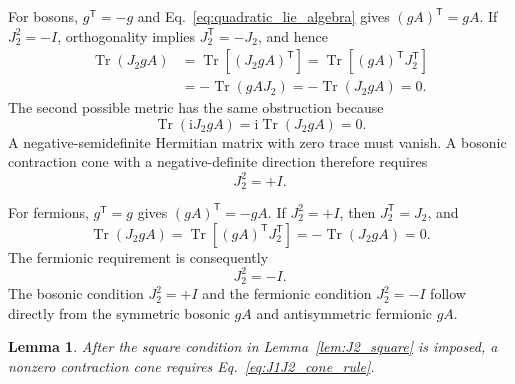 \documentclass[onecolumn,aps,prb,amsmath,amssymb,superscriptaddress,longbibliography,floatfix]{revtex4-2}
\newcommand{\Tr}{\operatorname{Tr}}
\newcommand{\ii}{\mathrm{i}}
\newcommand{\trans}{\mathsf{T}}
\newtheorem{lemma}{Lemma}
\begin{document}
For bosons, \(g^\trans=-g\) and Eq.~\eqref{eq:quadratic_lie_algebra} gives \((gA)^\trans=gA\).  If \(J_2^2=-I\), orthogonality implies \(J_2^\trans=-J_2\), and hence
\begin{equation}
\begin{aligned}
    \Tr(J_2gA)
    &=\Tr[(J_2gA)^\trans]
      =\Tr[(gA)^\trans J_2^\trans]\\
    &=-\Tr(gAJ_2)=-\Tr(J_2gA)=0.
\end{aligned}
    \label{eq:boson_trace_obstruction}
\end{equation}
The second possible metric has the same obstruction because
\begin{equation}
    \Tr(\ii J_2gA)=\ii\Tr(J_2gA)=0.
    \label{eq:boson_imaginary_metric_trace}
\end{equation}
A negative-semidefinite Hermitian matrix with zero trace must vanish.  A bosonic contraction cone with a negative-definite direction therefore requires
\begin{equation}
    J_2^2=+I.
    \label{eq:boson_J2_square}
\end{equation}

For fermions, \(g^\trans=g\) gives \((gA)^\trans=-gA\).  If \(J_2^2=+I\), then \(J_2^\trans=J_2\), and
\begin{equation}
    \Tr(J_2gA)
    =\Tr[(gA)^\trans J_2^\trans]
    =-\Tr(J_2gA)=0.
    \label{eq:fermion_trace_obstruction}
\end{equation}
The fermionic requirement is consequently
\begin{equation}
    J_2^2=-I.
    \label{eq:fermion_J2_square}
\end{equation}
The bosonic condition \(J_2^2=+I\) and the fermionic condition \(J_2^2=-I\) follow directly from the symmetric bosonic \(gA\) and antisymmetric fermionic \(gA\).

\begin{lemma}
After the square condition in Lemma~\ref{lem:J2_square} is imposed, a nonzero contraction cone requires Eq.~\eqref{eq:J1J2_cone_rule}.
\label{lem:J1J2_compatibility}
\end{lemma}
\end{document}
